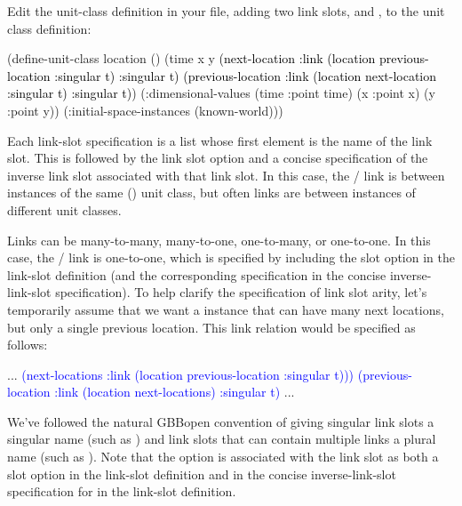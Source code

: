 \documentclass[10pt,twoside,english,pdftex]{article}
\begin{document}
Edit the  unit-class definition in your
 file, adding two link slots, 
and , to the  unit class definition:
%
\W\supp
\begin{example}
\textcolor{darkergray}{%
  (define-unit-class location ()
    (time 
     x y
     \textcolor{black}{(next-location
      :link (location previous-location :singular t) 
      :singular t)
     (previous-location
      :link (location next-location :singular t)  
      :singular t)})
    (:dimensional-values
      (time :point time)
      (x :point x)
      (y :point y))
    (:initial-space-instances (known-world)))}
\end{example}

Each link-slot specification is a list whose first element is the name of the
link slot.  This is followed by the link slot option  and a
concise specification of the inverse link slot associated with that link slot.
In this case, the / link is
between instances of the same () unit class, but often links
are between instances of different unit classes. 

Links can be many-to-many, many-to-one, one-to-many, or one-to-one.  In this
case, the / link is one-to-one,
which is specified by including the  slot option in the
link-slot definition (and the corresponding  specification
in the concise inverse-link-slot specification).  To help clarify the
specification of link slot arity, let's temporarily assume that we want a
 instance that can have many next locations, but only a single
previous location.  This link relation would be specified as follows:
%
\W\supp
\begin{example}
\textcolor{darkergray}{%
      ...
   \textcolor{blue}{(next-locations
    :link (location previous-location :singular t)))
   (previous-location
    :link (location next-locations)  
    :singular t)}
      ...}
\end{example}

We've followed the natural GBBopen convention of giving singular link
slots a singular name (such as ) and link
slots that can contain multiple links a plural name (such as
).  Note that the  option is
associated with the  link slot as both a slot
option in the  link-slot definition and in the
concise inverse-link-slot specification for 
in the  link-slot definition.
\end{document}
